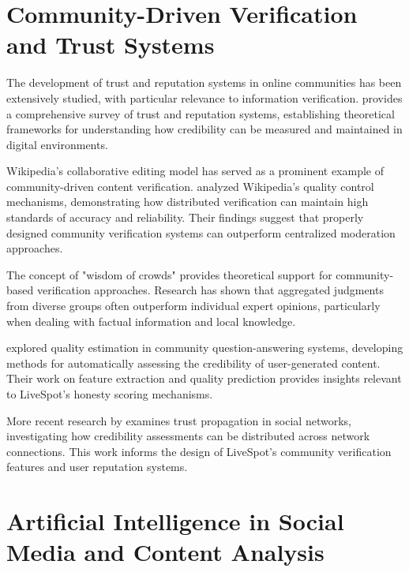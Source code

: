\section{Community-Driven Verification and Trust Systems}
\label{sec:community_verification}

The development of trust and reputation systems in online communities has been extensively studied, with particular relevance to information verification. \cite{josang2007survey} provides a comprehensive survey of trust and reputation systems, establishing theoretical frameworks for understanding how credibility can be measured and maintained in digital environments.

Wikipedia's collaborative editing model has served as a prominent example of community-driven content verification. \cite{kittur2007he} analyzed Wikipedia's quality control mechanisms, demonstrating how distributed verification can maintain high standards of accuracy and reliability. Their findings suggest that properly designed community verification systems can outperform centralized moderation approaches.

The concept of "wisdom of crowds" \citep{surowiecki2005wisdom} provides theoretical support for community-based verification approaches. Research has shown that aggregated judgments from diverse groups often outperform individual expert opinions, particularly when dealing with factual information and local knowledge.

\cite{agichtein2008finding} explored quality estimation in community question-answering systems, developing methods for automatically assessing the credibility of user-generated content. Their work on feature extraction and quality prediction provides insights relevant to LiveSpot's honesty scoring mechanisms.

More recent research by \cite{mohammadi2018trust} examines trust propagation in social networks, investigating how credibility assessments can be distributed across network connections. This work informs the design of LiveSpot's community verification features and user reputation systems.

\section{Artificial Intelligence in Social Media and Content Analysis}
\label{sec:ai_social_media}

